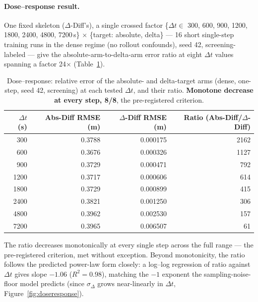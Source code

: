 \documentclass[11pt]{article}
\newcommand{\ours}{\mbox{$\Delta$-Diff}}       %
\newcommand{\absdiff}{\mbox{Abs-Diff}}          %
\begin{document}
\paragraph{Dose--response result.} One fixed skeleton (\ours{}'s), a
single crossed factor \{$\Delta t \in$ 300, 600, 900, 1200, 1800, 2400,
4800, 7200\,s\} $\times$ \{target: absolute, delta\} --- 16 short
single-step training runs in the dense regime (no rollout confounds),
seed 42, screening-labeled --- give the absolute-arm-to-delta-arm error
ratio at eight $\Delta t$ values spanning a factor 24$\times$
(Table~\ref{tab:doseresponse}).

\begin{table}[H]
\centering
\caption{Dose--response: relative error of the absolute- and delta-target
arms (dense, one-step, seed 42, screening) at each tested $\Delta t$, and
their ratio. \textbf{Monotone decrease at every step, 8/8}, the
pre-registered criterion.}
\label{tab:doseresponse}
\begin{tabular}{rrrr}
\toprule
$\Delta t$ (s) & \absdiff{} RMSE (m) & \ours{} RMSE (m) & Ratio (\absdiff{}/\ours{}) \\
\midrule
300  & 0.3788 & 0.000175 & 2162 \\
600  & 0.3676 & 0.000326 & 1127 \\
900  & 0.3729 & 0.000471 & 792 \\
1200 & 0.3717 & 0.000606 & 614 \\
1800 & 0.3729 & 0.000899 & 415 \\
2400 & 0.3821 & 0.001250 & 306 \\
4800 & 0.3962 & 0.002530 & 157 \\
7200 & 0.3965 & 0.006507 & 61 \\
\bottomrule
\end{tabular}
\end{table}

The ratio decreases monotonically at every single step across the full
range --- the pre-registered criterion, met without exception. Beyond
monotonicity, the ratio follows the predicted power-law form closely: a
log--log regression of ratio against $\Delta t$ gives slope $-1.06$
($R^2=0.98$), matching the $-1$ exponent the sampling-noise-floor model
predicts (since $\sigma_\Delta$ grows near-linearly in $\Delta t$,
Figure~\ref{fig:doseresponse}).
\end{document}
